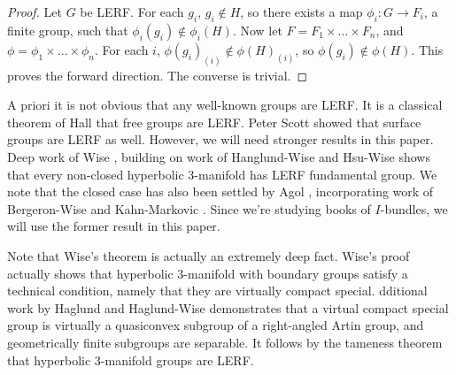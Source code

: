 \begin{proof}

Let $G$ be LERF. For each $g_i$, $g_i \notin H$, so there exists a map $\phi_i
\colon G \to F_i$, a finite group, such that $\phi_i(g_i) \notin \phi_i(H)$.
Now let $F = F_1 \times \dots \times F_n$, and $\phi = \phi_1 \times \dots
\times \phi_n$.  For each $i$, $\phi(g_i)_{(i)} \notin \phi(H)_{(i)}$, so
$\phi(g_i) \notin \phi(H)$.  This proves the forward direction.  The converse
is trivial.

\end{proof}



A priori it is not obvious that any well-known groups are LERF. It is
a classical theorem of Hall \cite{Hall} that free groups are LERF. Peter Scott
\cite{Scott} showed that surface groups are LERF as well. However, we will need
stronger results in this paper. Deep work of Wise \cite{Wise}, building on work
of Hanglund-Wise \cite{HaglundWise} and Hsu-Wise \cite{HsuWise} shows that
every non-closed hyperbolic 3-manifold has LERF fundamental group. We note that
the closed case has also been settled by Agol \cite{Agol}, incorporating work
of Bergeron-Wise \cite{BergeronWise} and Kahn-Markovic \cite{KM}. Since we're
studying books of $I$-bundles, we will use the former result in this paper.

Note that Wise's theorem is actually an extremely deep fact. Wise's proof
actually shows that hyperbolic 3-manifold with boundary groups satisfy
a technical condition, namely that they are virtually compact special.
dditional work by Haglund and Haglund-Wise demonstrates that a virtual compact
special group is virtually a quasiconvex subgroup of a right-angled Artin
group, and geometrically finite subgroups are separable.  It follows by the
tameness theorem that hyperbolic 3-manifold groups are LERF.

%
%


